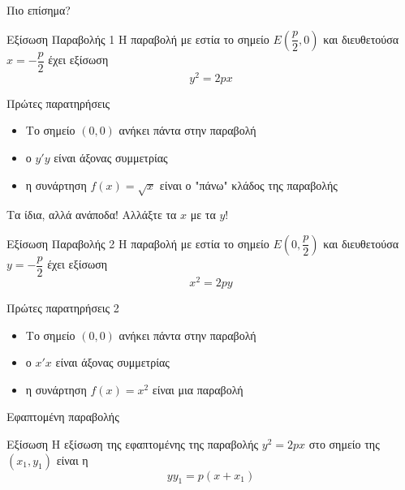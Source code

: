 \documentclass{presentation}
\begin{document}
\begin{frame}[label=Παραβολή]{Πιο επίσημα?}
  \begin{block}{Εξίσωση Παραβολής 1}
    Η παραβολή με εστία το σημείο $Ε(\dfrac{p}{2},0)$ και διευθετούσα $x=-\dfrac{p}{2}$ έχει εξίσωση
    $$y^2=2px$$
  \end{block}

  \hyperlink{ΑπόδειξηΕξίσωσης}{}

\end{frame}

\begin{frame}{Πρώτες παρατηρήσεις}
  \begin{itemize}
    \item<1-> Το σημείο $(0,0)$ ανήκει πάντα στην παραβολή
    \item<2-> ο $y'y$ είναι άξονας συμμετρίας
    \item<3-> η συνάρτηση $f(x)=\sqrt{x}$ είναι ο "πάνω" κλάδος της παραβολής
  \end{itemize}
\end{frame}

\begin{frame}{Τα ίδια, αλλά ανάποδα!}
  Αλλάξτε τα $x$ με τα $y$!
  \begin{block}{Εξίσωση Παραβολής 2}
    Η παραβολή με εστία το σημείο $Ε(0,\dfrac{p}{2})$ και διευθετούσα $y=-\dfrac{p}{2}$ έχει εξίσωση
    $$x^2=2py$$
  \end{block}
\end{frame}

\begin{frame}{Πρώτες παρατηρήσεις 2}
  \begin{itemize}
    \item<1-> Το σημείο $(0,0)$ ανήκει πάντα στην παραβολή
    \item<2-> ο $x'x$ είναι άξονας συμμετρίας
    \item<3-> η συνάρτηση $f(x)=x^2$ είναι μια παραβολή
  \end{itemize}
\end{frame}

\begin{frame}[label=Εφαπτόμενη]{Εφαπτομένη παραβολής}
  \begin{block}{Εξίσωση}
    Η εξίσωση της εφαπτομένης της παραβολής $y^2=2px$ στο σημείο της $(x_1,y_1)$ είναι η $$yy_1=p(x+x_1)$$
  \end{block}

  \hyperlink{ΑπόδειξηΕφαπτόμενη}{}
\end{frame}
\end{document}
